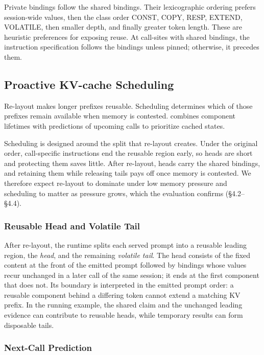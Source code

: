 Private bindings follow the shared bindings. Their lexicographic ordering prefers session-wide values, then the class order CONST, COPY, RESP, EXTEND, VOLATILE, then smaller depth, and finally greater token length. These are heuristic preferences for exposing reuse. At call-sites with shared bindings, the instruction specification follows the bindings unless pinned; otherwise, it precedes them.

\subsection{Proactive KV-cache Scheduling}
\label{sec:Proactive KV-Cache Scheduling}

Re-layout makes longer prefixes reusable. Scheduling determines which of those prefixes remain available when memory is contested. \sysname combines component lifetimes with predictions of upcoming calls to prioritize cached states.

Scheduling is designed around the split that re-layout creates. Under the original order, call-specific instructions end the reusable region early, so heads are short and protecting them saves little. After re-layout, heads carry the shared bindings, and retaining them while releasing tails pays off once memory is contested. We therefore expect re-layout to dominate under low memory pressure and scheduling to matter as pressure grows, which the evaluation confirms (\S4.2--\S4.4). %

\subsubsection{Reusable Head and Volatile Tail}
\label{sec:identify_reusable_kv}

After re-layout, the runtime splits each served prompt into a reusable leading region, the \emph{head}, and the remaining \emph{volatile tail}. The head consists of the fixed content at the front of the emitted prompt followed by bindings whose values recur unchanged in a later call of the same session; it ends at the first component that does not. Its boundary is interpreted in the emitted prompt order: a reusable component behind a differing token cannot extend a matching KV prefix. In the running example, the shared claim and the unchanged leading evidence can contribute to reusable heads, while temporary results can form disposable tails.

\subsubsection{Next-Call Prediction}

